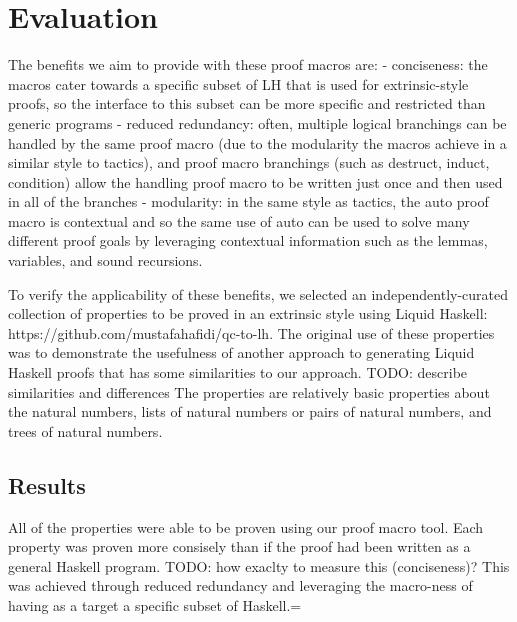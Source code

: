 \section{Evaluation}

The benefits we aim to provide with these proof macros are:
- conciseness: the macros cater towards a specific subset of LH that is used for extrinsic-style proofs, so the interface to this subset can be more specific and restricted than generic programs
- reduced redundancy: often, multiple logical branchings can be handled by the same proof macro (due to the modularity the macros achieve in a similar style to tactics), and proof macro branchings (such as destruct, induct, condition) allow the handling proof macro to be written just once and then used in all of the branches
- modularity: in the same style as tactics, the auto proof macro is contextual and so the same use of auto can be used to solve many different proof goals by leveraging contextual information such as the lemmas, variables, and sound recursions.

To verify the applicability of these benefits, we selected an independently-curated collection of properties to be proved in an extrinsic style using Liquid Haskell: https://github.com/mustafahafidi/qc-to-lh. The original use of these properties was to demonstrate the usefulness of another approach to generating Liquid Haskell proofs that has some similarities to our approach.
TODO: describe similarities and differences
The properties are relatively basic properties about the natural numbers, lists of natural numbers or pairs of natural numbers, and trees of natural numbers.


\subsection{Results}

All of the properties were able to be proven using our proof macro tool.
Each property was proven more consisely than if the proof had been written as a general Haskell program.
TODO: how exaclty to measure this (conciseness)?
This was achieved through reduced redundancy and leveraging the macro-ness of having as a target a specific subset of Haskell.=

